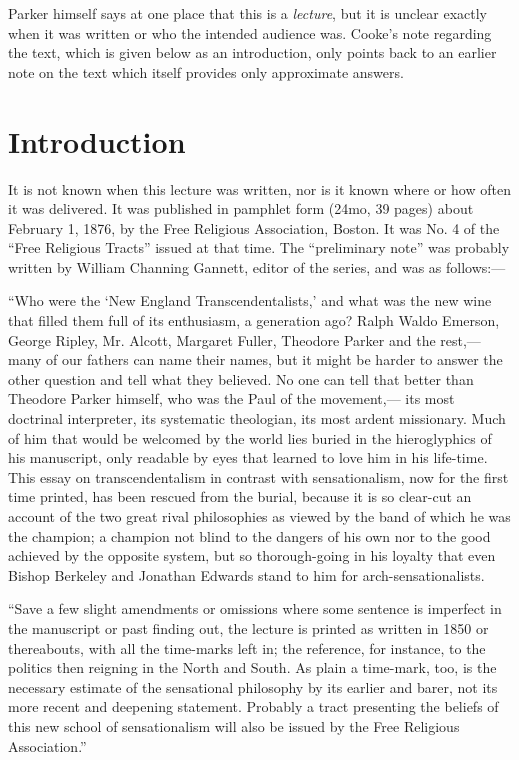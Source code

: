 \documentclass[12pt]{article}
\begin{document}
Parker himself says at one place that this is a \emph{lecture}, but it is unclear exactly when it was written or who the intended audience was. Cooke's note regarding the text, which is given below as an introduction, only points back to an earlier note on the text which itself provides only approximate answers.

\section*{Introduction}

It is not known when this lecture was written, nor is it known where or how often it was delivered. It was published in pamphlet form (24mo, 39 pages) about February 1, 1876, by the Free Religious Association, Boston. It was No. 4 of the ``Free Religious Tracts'' issued at that time. The ``preliminary note'' was probably written by William Channing Gannett, editor of the series, and was as follows:---

``Who were the `New England Transcendentalists,' and what was the new wine that filled them full of its enthusiasm, a generation ago? Ralph Waldo Emerson, George Ripley, Mr. Alcott, Margaret Fuller, Theodore Parker and the rest,--- many of our fathers can name their names, but it might be harder to answer the other question and tell what they believed. No one can tell that better than Theodore Parker himself, who was the Paul of the movement,--- its most doctrinal interpreter, its systematic theologian, its most ardent missionary. Much of him that would be welcomed by the world lies buried in the hieroglyphics of his manuscript, only readable by eyes that learned to love him in his life-time. This essay on transcendentalism in contrast with sensationalism, now for the first time printed, has been rescued from the burial, because it is so clear-cut an account of the two great rival philosophies as viewed by the band of which he was the champion; a champion not blind to the dangers of his own nor to the good achieved by the opposite system, but so thorough-going in his loyalty that even Bishop Berkeley and Jonathan Edwards stand to him for arch-sensationalists. 

``Save a few slight amendments or omissions where some sentence is imperfect in the manuscript or past finding out, the lecture is printed as written in 1850 or thereabouts, with all the time-marks left in; the reference, for instance, to the politics then reigning in the North and South. As plain a time-mark, too, is the necessary estimate of the sensational philosophy by its earlier and barer, not its more recent and deepening statement. Probably a tract presenting the beliefs of this new school of sensationalism will also be issued by the Free Religious Association.''
\end{document}
